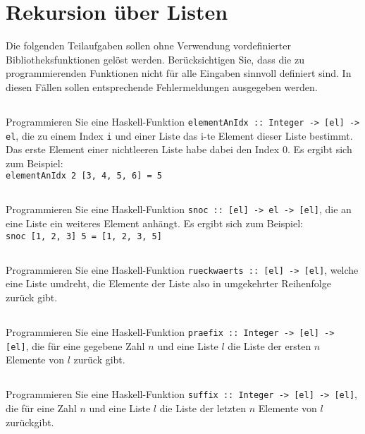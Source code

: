 \documentclass[
  10pt,                   %
  DIV12,
  german,                 %
  oneside,                %
  parskip=half,           %
  headings=normal,        %
  captions=tableheading,  %
]{scrartcl}
\begin{document}
\section{Rekursion über Listen}
Die folgenden Teilaufgaben sollen ohne Verwendung vordefinierter Bibliotheksfunktionen gelöst werden. Berücksichtigen Sie, dass die zu programmierenden Funktionen nicht für alle Eingaben sinnvoll definiert sind. In diesen Fällen sollen entsprechende Fehlermeldungen ausgegeben werden.
\subsection{}	
Programmieren Sie eine Haskell-Funktion \lstinline|elementAnIdx :: Integer -> [el] -> el|, die zu einem Index \lstinline|i| und einer Liste das i-te Element dieser Liste bestimmt. Das erste Element einer nichtleeren Liste habe dabei den Index $0$. Es ergibt sich zum Beispiel:\\
\lstinline|elementAnIdx 2 [3, 4, 5, 6] = 5|
\subsection{}
Programmieren Sie eine Haskell-Funktion \lstinline|snoc :: [el] -> el -> [el]|, die an eine Liste ein weiteres Element anhängt. Es ergibt sich zum Beispiel:\\
\lstinline|snoc [1, 2, 3] 5 = [1, 2, 3, 5]|
\subsection{}
Programmieren Sie eine Haskell-Funktion \lstinline|rueckwaerts :: [el] -> [el]|, welche eine Liste umdreht, die Elemente der Liste also in umgekehrter Reihenfolge zurück gibt.
\subsection{}
Programmieren Sie eine Haskell-Funktion \lstinline|praefix :: Integer -> [el] -> [el]|, die für eine gegebene Zahl $n$ und eine Liste $l$ die Liste der ersten $n$ Elemente von $l$ zurück gibt.
\subsection{}
Programmieren Sie eine Haskell-Funktion \lstinline|suffix :: Integer -> [el] -> [el]|, die für eine Zahl $n$ und eine Liste $l$ die Liste der letzten $n$ Elemente von $l$ zurückgibt.
\newpage
\end{document}
